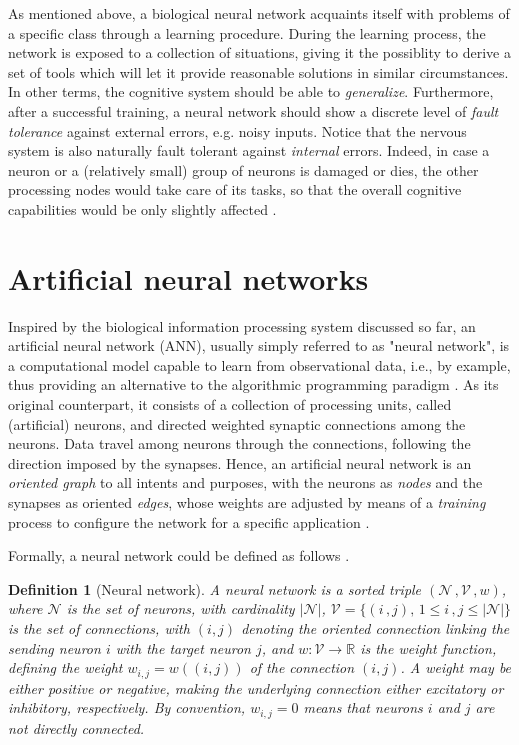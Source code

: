 \documentclass[12pt, a4paper, twoside, openright, notitlepage]{report}
\numberwithin{equation}{chapter}
\theoremstyle{theorem}
\theoremstyle{definition}
\newtheorem{definition}{Definition}[chapter]
\theoremstyle{remark}
\theoremstyle{proposition}
\numberwithin{figure}{chapter}
\begin{document}
		 As mentioned above, a biological neural network acquaints itself with problems of a specific class through a learning procedure. During the learning process, the network is exposed to a collection of situations, giving it the possiblity to derive a set of tools which will let it provide reasonable solutions in similar circumstances. In other terms, the cognitive system should be able to \emph{generalize}. Furthermore, after a successful training, a neural network should show a discrete level of \emph{fault tolerance} against external errors, e.g. noisy inputs. Notice that the nervous system is also naturally fault tolerant against \emph{internal} errors. Indeed, in case a neuron or a (relatively small) group of neurons is damaged or dies, the other processing nodes would take care of its tasks, so that the overall cognitive capabilities would be only slightly affected \cite{Kri07}. 
		 		 
	\vspace*{0.3cm}
		 		
	\section{Artificial neural networks}
	\label{section:Artificial neural networks}
				
		Inspired by the biological information processing system discussed so far, an artificial neural network (ANN), usually simply referred to as "neural network", is a computational model capable to learn from observational data, i.e., by example, thus providing an alternative to the algorithmic programming paradigm \cite{Nie15}. As its original counterpart, it consists of a collection of processing units, called (artificial) neurons, and directed weighted synaptic connections among the neurons. Data travel among neurons through the connections, following the direction imposed by the synapses. Hence, an artificial neural network is an \emph{oriented graph} to all intents and purposes, with the neurons as \emph{nodes} and the synapses as oriented \emph{edges}, whose weights are adjusted by means of a \emph{training} process to configure the network for a specific application \cite{SD13}. 
		
		Formally, a neural network could be defined as follows \cite{Kri07}.
		
		\begin{definition}[Neural network]
			\label{def:neural-network}
			\emph{
			A \emph{neural network} is a sorted triple $\left( \mathcal{N} \, , \mathcal{V} \, , w \right)$, where $\mathcal{N}$ is the set of \emph{neurons}, with cardinality $|\mathcal{N}|$, $\mathcal{V} = \big\lbrace (i \, , j), \, 1 \leq i \, , j  \leq |\mathcal{N}| \big\rbrace$ is the set of \emph{connections}, with $(i,j)$ denoting the oriented connection linking the sending neuron $i$ with the target neuron $j$, and $w : \mathcal{V} \rightarrow \mathbb{R}$ is the \emph{weight function}, defining the weight $w_{i,j} = w((i,j))$ of the connection $(i,j)$. A weight may be either positive or negative, making the underlying connection either excitatory or inhibitory, respectively. By convention, $w_{i,j} = 0$ means that neurons $i$ and $j$ are not directly connected.
			}
		\end{definition}
		
\end{document}
